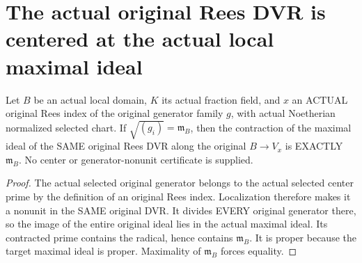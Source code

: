 \section{The actual original Rees DVR is centered at the actual local maximal ideal}
\begin{theorem}
\label{thm:actual-rees-local-center}
Let $B$ be an actual local domain, $K$ its actual fraction field, and
$x$ an ACTUAL original Rees index of the original generator family $g$,
with actual Noetherian normalized selected chart. If
$\sqrt{(g_i)}=\mathfrak m_B$, then the contraction of the maximal ideal
of the SAME original Rees DVR along the original $B\to V_x$ is EXACTLY
$\mathfrak m_B$. No center or generator-nonunit certificate is supplied.
\leanok
\end{theorem}
\begin{proof}
The actual selected original generator belongs to the actual selected
center prime by the definition of an original Rees index. Localization
therefore makes it a nonunit in the SAME original DVR. It divides EVERY
original generator there, so the image of the entire original ideal
lies in the actual maximal ideal. Its contracted prime contains the
radical, hence contains $\mathfrak m_B$. It is proper because the target
maximal ideal is proper. Maximality of $\mathfrak m_B$ forces equality.
\end{proof}
